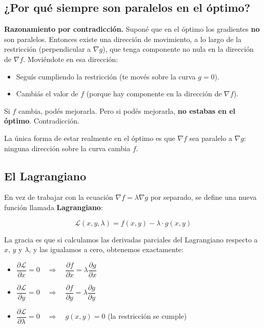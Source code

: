 \documentclass[12pt]{article}
\begin{document}
\subsection{¿Por qué siempre son paralelos en el óptimo?}

\textbf{Razonamiento por contradicción.} Suponé que en el óptimo los gradientes \textbf{no} son paralelos. Entonces existe una dirección de movimiento, a lo largo de la restricción (perpendicular a $\nabla g$), que tenga componente no nula en la dirección de $\nabla f$. Moviéndote en esa dirección:

\begin{itemize}
    \item Seguís cumpliendo la restricción (te movés sobre la curva $g = 0$).
    \item Cambiás el valor de $f$ (porque hay componente en la dirección de $\nabla f$).
\end{itemize}

\vspace{0.3em}

Si $f$ cambia, podés mejorarla. Pero si podés mejorarla, \textbf{no estabas en el óptimo}. Contradicción.

\vspace{0.5em}

La única forma de estar realmente en el óptimo es que $\nabla f$ sea paralelo a $\nabla g$: ninguna dirección sobre la curva cambia $f$.

\subsection{El Lagrangiano}

En vez de trabajar con la ecuación $\nabla f = \lambda \nabla g$ por separado, se define una nueva función llamada \textbf{Lagrangiano}:

\[
\mathcal{L}(x, y, \lambda) = f(x, y) - \lambda \cdot g(x, y)
\]

La gracia es que si calculamos las derivadas parciales del Lagrangiano respecto a $x$, $y$ y $\lambda$, y las igualamos a cero, obtenemos exactamente:

\begin{itemize}
    \item $\dfrac{\partial \mathcal{L}}{\partial x} = 0 \quad \Rightarrow \quad \dfrac{\partial f}{\partial x} = \lambda \dfrac{\partial g}{\partial x}$
    \item $\dfrac{\partial \mathcal{L}}{\partial y} = 0 \quad \Rightarrow \quad \dfrac{\partial f}{\partial y} = \lambda \dfrac{\partial g}{\partial y}$
    \item $\dfrac{\partial \mathcal{L}}{\partial \lambda} = 0 \quad \Rightarrow \quad g(x, y) = 0$ (la restricción se cumple)
\end{itemize}
\end{document}
